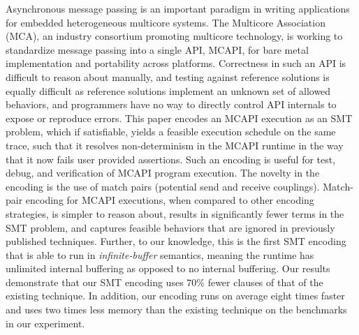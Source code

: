 Asynchronous message passing is an important paradigm in writing
applications for embedded heterogeneous multicore systems.  The
Multicore Association (MCA), an industry consortium promoting
multicore technology, is working to standardize message passing into a
single API, MCAPI, for bare metal implementation and portability
across platforms.  Correctness in such an API is difficult to reason
about manually, and testing against reference solutions is equally
difficult as reference solutions implement an unknown set of allowed
behaviors, and programmers have no way to directly control API
internals to expose or reproduce errors.  This paper encodes an MCAPI
execution as an SMT problem, which if satisfiable, yields a feasible
execution schedule on the same trace,
such that it resolves non-determinism in the MCAPI runtime in the way that it now fails user provided assertions.
Such an encoding is useful for test, debug, and
verification of MCAPI program execution.  The novelty in the encoding
is the use of match pairs (potential send and receive couplings).  Match-pair encoding for
MCAPI executions, when compared to other encoding strategies, is
simpler to reason about, results in significantly fewer terms in the
SMT problem, and captures feasible behaviors that are ignored in
previously published techniques. Further, to our knowledge, this is the first SMT encoding  that is able to run in \textit{infinite-buffer} semantics, meaning the runtime has unlimited internal buffering as opposed to no internal buffering. %
Our results demonstrate that our SMT encoding uses $70\%$ fewer clauses of that of the existing technique. In addition, our encoding runs on average eight times faster and uses two times less memory than the existing technique on the benchmarks in our experiment.

